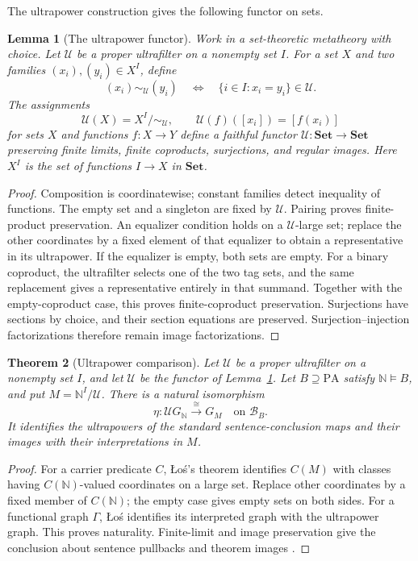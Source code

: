 \documentclass[11pt]{article}
\newtheorem{theorem}{Theorem}[section]
\newtheorem{lemma}[theorem]{Lemma}
\theoremstyle{definition}\newtheorem{definition}[theorem]{Definition}
\newcommand{\PA}{\mathrm{PA}}
\newcommand{\N}{\mathbb N}
\newcommand{\Set}{\mathbf{Set}}
\newcommand{\B}{\mathcal B}
\newcommand{\U}{\mathcal U}
\begin{document}
The ultrapower construction \cite[Theorem 3.1 and Proposition 4.2]{Keisler}
gives the following functor on sets.
\begin{lemma}[The ultrapower functor]\label{lem:ultrafunctor}
Work in a set-theoretic metatheory with choice. Let $\U$ be a proper
ultrafilter on a nonempty set $I$. For a set $X$ and two families
$(x_i),(y_i)\in X^I$, define
\[
 (x_i)\sim_{\U}(y_i)
 \quad\Longleftrightarrow\quad
 \{i\in I:x_i=y_i\}\in\U.
\]
The assignments
\[
 \mathscr U(X)=X^I/{\sim_{\U}},\qquad
 \mathscr U(f)([x_i])=[f(x_i)]
\]
for sets $X$ and functions $f:X\to Y$ define a faithful functor
$\mathscr U:\Set\to\Set$ preserving
finite limits, finite coproducts, surjections, and regular images.
Here $X^I$ is the set of functions $I\to X$ in $\Set$.
\end{lemma}
\begin{proof}
Composition is coordinatewise; constant families detect inequality
of functions. The empty set and a singleton are fixed by $\mathscr U$.
Pairing proves finite-product preservation. An
equalizer condition holds on a $\U$-large set; replace the other
coordinates by a fixed element of that equalizer to obtain a
representative in its ultrapower. If the equalizer is empty, both
sets are empty. For a binary coproduct, the ultrafilter selects one
of the two tag sets, and the same replacement gives a representative
entirely in that summand. Together with the empty-coproduct case,
this proves finite-coproduct preservation.
Surjections have sections by choice, and their
section equations are preserved. Surjection--injection factorizations
therefore remain image factorizations.
\end{proof}

\begin{theorem}[Ultrapower comparison]\label{thm:ultra}
Let $\U$ be a proper ultrafilter on a nonempty set $I$, and let
$\mathscr U$ be the functor of Lemma~\ref{lem:ultrafunctor}.
Let $B\supseteq\PA$ satisfy $\N\models B$, and put
$M=\N^I/\U$. There is a natural isomorphism
\[
 \eta:\mathscr U G_{\N}\xrightarrow{\cong}G_M
 \quad\text{on }\B_B.
\]
It identifies the ultrapowers of the standard sentence-conclusion
maps and their images with their interpretations in $M$.
\end{theorem}
\begin{proof}
For a carrier predicate $C$, \L{}o\'s's theorem identifies
$C(M)$ with classes having $C(\N)$-valued coordinates on a large
set. Replace other coordinates by a fixed member of $C(\N)$;
the empty case gives empty sets on both sides. For a functional
graph $\Gamma$, \L{}o\'s identifies its interpreted graph with the
ultrapower graph. This proves naturality. Finite-limit and image
preservation give the conclusion about sentence pullbacks and
theorem images \cite{Keisler}.
\end{proof}
\end{document}
